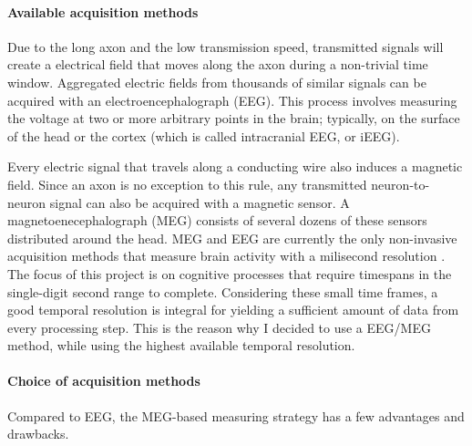 \paragraph {Available acquisition methods}
Due to the long axon and the low transmission speed, transmitted signals will create a electrical field that moves along the axon during a non-trivial time window.
Aggregated electric fields from thousands of similar signals can be acquired with an electroencephalograph (EEG).
This process involves measuring the voltage at two or more arbitrary points in the brain; typically, on the surface of the head or the cortex (which is called intracranial EEG, or iEEG).

Every electric signal that travels along a conducting wire also induces a magnetic field.
Since an axon is no exception to this rule, any transmitted neuron-to-neuron signal can also be acquired with a magnetic sensor.
A magnetoenecephalograph (MEG) consists of several dozens of these sensors distributed around the head.
MEG and EEG are currently the only non-invasive acquisition methods that measure brain activity with a milisecond resolution \cite{1.5.MEG.a}\cite{1.5.MEG.b}\cite{1.5.MEG.c}.
The focus of this project is on cognitive processes that require timespans in the single-digit second range to complete.
Considering these small time frames, a good temporal resolution is integral for yielding a sufficient amount of data from every processing step.
This is the reason why I decided to use a EEG/MEG method, while using the highest available temporal resolution.

\paragraph{Choice of acquisition methods}
Compared to EEG, the MEG-based measuring strategy has a few advantages and drawbacks.

